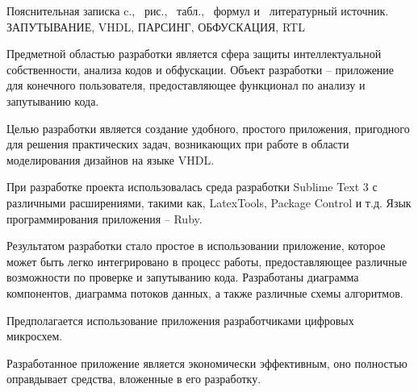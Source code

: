 \thispagestyle{empty}


\begin{center}
Пояснительная записка \pageref*{LastPage}c., \totfig{}~рис., \tottab{}~табл., \toteq{}~формул и \totref{}~литературный источник.\\
ЗАПУТЫВАНИЕ, VHDL, ПАРСИНГ, ОБФУСКАЦИЯ, RTL
\end{center}

Предметной областью разработки является сфера защиты интеллектуальной собственности, анализа кодов и обфускации. Объект разработки -- приложение для конечного пользователя, предоставляющее функционал по анализу и запутыванию кода.

Целью разработки является создание удобного, простого приложения, пригодного для решения практических задач, возникающих при работе в области моделирования дизайнов на языке VHDL.

При разработке проекта использовалась среда разработки Sublime Text 3 с различными расширениями, такими как, LatexTools, Package Control и т.д. Язык программирования приложения -- Ruby.


Результатом разработки стало простое в использовании приложение, которое может быть легко интегрировано в процесс работы, предоставляющее различные возможности по проверке и запутыванию кода. Разработаны диаграмма компонентов, диаграмма потоков данных, а также различные схемы алгоритмов.

Предполагается использование приложения разработчиками цифровых микросхем.

Разработанное приложение является экономически эффективным, оно полностью  оправдывает средства, вложенные в его разработку.





\clearpage

